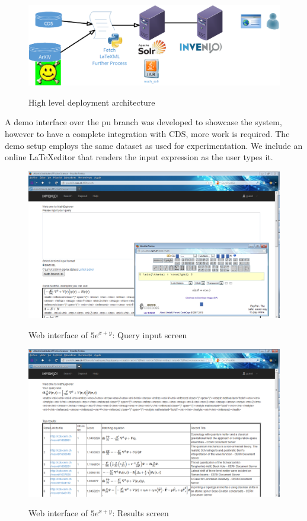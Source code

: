 \begin{figure}[h!]
\includegraphics[height=4.2 cm]{visio_drawings/architecture.png}
\label{system_arch}
\caption{High level deployment architecture}
\end{figure}


A demo interface over the {\codefont pu} branch was developed to showcase the system, however to have a complete integration with CDS, more work is required. The demo setup employs the same dataset as used for experimentation.
We include an online \LaTeX editor\cite{latex_editor} that renders the input expression as the user types it. 

\begin{figure}
\center
\includegraphics[height=6.2 cm]{figures/input_interface.png}
\label{input_int}
\caption{Web interface of $5e^{x+y}$: Query input screen}
\end{figure}

\begin{figure}
\center
\includegraphics[height=6.2 cm]{figures/results_interface.png}
\label{results_int}
\caption{Web interface of $5e^{x+y}$: Results screen}
\end{figure}
	
 
